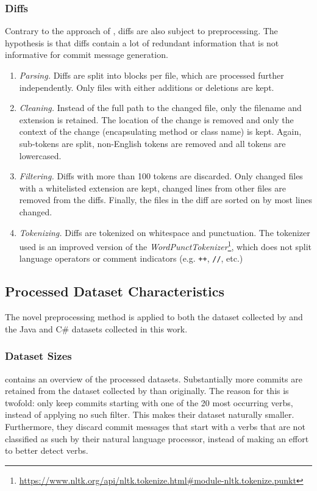 \subsubsection{Diffs}
Contrary to the approach of \citet{jiang_automatically_2017}, diffs are also subject to preprocessing. The hypothesis is that diffs contain a lot of redundant information that is not informative for commit message generation.

\begin{enumerate}
    \item \textit{Parsing.} Diffs are split into blocks per file, which are processed further independently. Only files with either additions or deletions are kept.
    
    \item \textit{Cleaning.} Instead of the full path to the changed file, only the filename and extension is retained. The location of the change is removed and only the context of the change (encapsulating method or class name) is kept. Again, sub-tokens are split, non-English tokens are removed and all tokens are lowercased.
    
    \item \textit{Filtering.} Diffs with more than 100 tokens are discarded. Only changed files with a whitelisted extension are kept, changed lines from other files are removed from the diffs. Finally, the files in the diff are sorted on by most lines changed.
    
    \item \textit{Tokenizing.} Diffs are tokenized on whitespace and punctuation. The tokenizer used is an improved version of the \textit{WordPunctTokenizer}\footnote{\url{https://www.nltk.org/api/nltk.tokenize.html\#module-nltk.tokenize.punkt}}, which does not split language operators or comment indicators (e.g. \texttt{++}, \texttt{//}, etc.)
\end{enumerate}

\subsection{Processed Dataset Characteristics}\label{sec:prep:analysis}
The novel preprocessing method is applied to both the dataset collected by \citet{jiang_towards_2017} and the Java and C\# datasets collected in this work. 

\subsubsection{Dataset Sizes}
 contains an overview of the processed datasets. Substantially more commits are retained from the dataset collected by \citet{jiang_towards_2017} than originally. The reason for this is twofold: \citet{jiang_automatically_2017} only keep commits starting with one of the 20 most occurring verbs, instead of applying no such filter. This makes their dataset naturally smaller. Furthermore, they discard commit messages that start with a verbs that are not classified as such by their natural language processor, instead of making an effort to better detect verbs.

